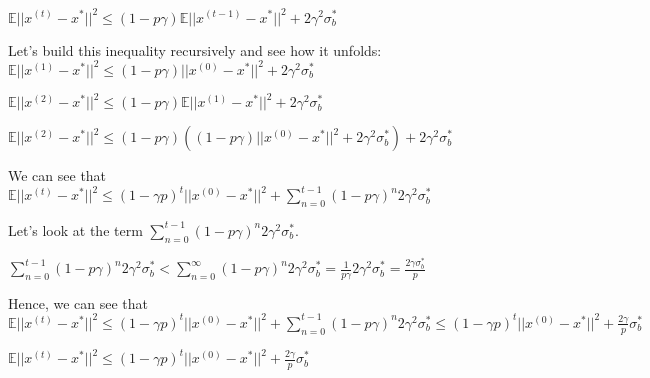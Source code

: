$\mathbb{E}||x^{(t)} - x^*||^2  \leq (1 - p \gamma) \mathbb{E}||x^{(t - 1)} - x^*||^2 + 2\gamma^2 \sigma_b^*$ \newline 

Let's build this inequality recursively and see how it unfolds: \newline 
$\mathbb{E}||x^{(1)} - x^*||^2  \leq (1 - p \gamma) ||x^{(0)} - x^*||^2 + 2\gamma^2 \sigma_b^*$ \newline 

$\mathbb{E}||x^{(2)} - x^*||^2  \leq (1 - p \gamma) \mathbb{E}||x^{(1)} - x^*||^2 + 2\gamma^2 \sigma_b^*$ \newline 

$\mathbb{E}||x^{(2)} - x^*||^2  \leq (1 - p \gamma) ((1 - p \gamma) ||x^{(0)} - x^*||^2 + 2\gamma^2 \sigma_b^*) + 2\gamma^2 \sigma_b^*$ \newline 


We can see that $\mathbb{E}||x^{(t)} - x^*||^2 \leq (1 - \gamma p)^t ||x^{(0)} - x^*||^2 + \sum_{n=0}^{t - 1} (1 - p\gamma)^n 2\gamma^2 \sigma_b^*$

Let's look at the term $\sum_{n=0}^{t - 1} (1 - p\gamma)^n 2\gamma^2 \sigma_b^*$. 

$\sum_{n=0}^{t - 1} (1 - p\gamma)^n 2\gamma^2 \sigma_b^* < \sum_{n=0}^{\infty} (1 - p\gamma)^n 2\gamma^2 \sigma_b^* = \frac{1}{p\gamma} 2\gamma^2 \sigma_b^* = \frac{2\gamma \sigma_b^*}{p}$

Hence, we can see that \newline 
$\mathbb{E}||x^{(t)} - x^*||^2 \leq (1 - \gamma p)^t ||x^{(0)} - x^*||^2 + \sum_{n=0}^{t - 1} (1 - p\gamma)^n 2\gamma^2 \sigma_b^* \leq (1 - \gamma p)^t ||x^{(0)} - x^*||^2 + \frac{2 \gamma}{p} \sigma_b^*$

$\mathbb{E}||x^{(t)} - x^*||^2 \leq (1 - \gamma p)^t ||x^{(0)} - x^*||^2 + \frac{2 \gamma}{p} \sigma_b^*$
